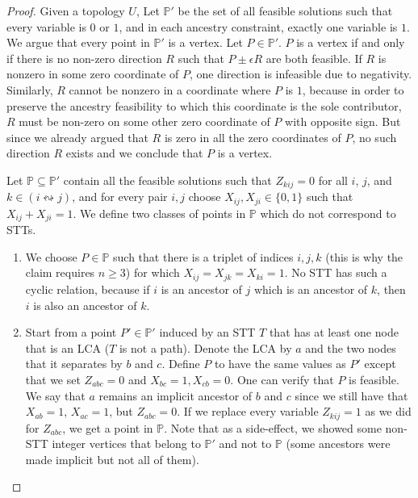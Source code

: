\begin{proof}
Given a topology $U$, Let $\mathbb{P}'$ be the set of all feasible solutions such that every variable is $0$ or $1$, and in each ancestry constraint, exactly one variable is $1$. We argue that every point in $\mathbb{P}'$ is a vertex. Let $P \in \mathbb{P}'$.
$P$ is a vertex if and only if there is no non-zero direction $R$ such that $P \pm \epsilon R$ are both feasible. If $R$ is nonzero in some zero coordinate of $P$, one direction is infeasible due to negativity. Similarly, $R$ cannot be nonzero in  a coordinate where $P$ is $1$, because in order to preserve the ancestry feasibility to which this coordinate is the sole  contributor, $R$ must be non-zero on some other zero coordinate of $P$ with opposite sign. But since we already argued that $R$ is zero in all the zero coordinates of $P$, no such direction $R$ exists and we conclude that $P$ is a vertex.

Let $\mathbb{P} \subseteq \mathbb{P}'$ contain all the feasible solutions such that
$Z_{kij}=0$ for all $i$, $j$, and $k\in (i \leftrightsquigarrow j)$, and for every pair $i,j$ choose $X_{ij},X_{ji} \in \{0,1\}$ such that $X_{ij} + X_{ji} = 1$. We define two classes of points in $\mathbb{P}$ which do not correspond to STTs.

\begin{enumerate}
    \item We choose $P \in \mathbb{P}$ such that there is a triplet of indices $i,j,k$ (this is why the claim requires $n \ge 3$) for which $X_{ij} = X_{jk} = X_{ki} = 1$. No STT has such a cyclic relation, because if $i$ is an ancestor of $j$ which is an ancestor of $k$, then $i$ is also an ancestor of $k$.

    \item Start from a point $P' \in \mathbb{P}'$ induced by an STT $T$ that has at least one node that is an LCA ($T$ is not a path). Denote the LCA by $a$ and the two nodes that it separates by $b$ and $c$. Define $P$ to have the same values as $P'$ except that we set $Z_{abc} = 0$ and $X_{bc}=1,X_{cb}=0$. One can verify that $P$ is feasible.
    We say that $a$ remains an implicit ancestor of $b$ and $c$ since we still have that $X_{ab}=1$, $X_{ac}=1$, but 
    $Z_{abc} = 0$.
    If we replace every variable $Z_{kij}=1$ as we did for $Z_{abc}$, we  get a point in $\mathbb{P}$. Note that as a side-effect, we showed some non-STT integer vertices that belong to $\mathbb{P}'$ and not to $\mathbb{P}$ (some ancestors were made implicit but not all of them). \qedhere
\end{enumerate}
\end{proof}

